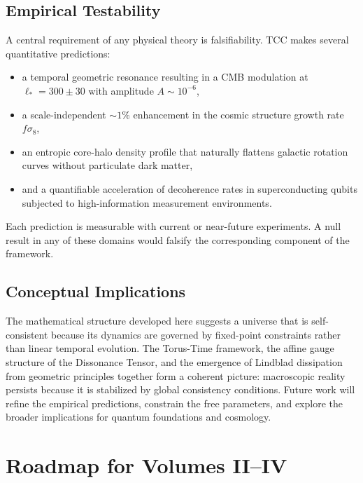 \documentclass[12pt,openany]{book}
\theoremstyle{plain}
\theoremstyle{definition}
\theoremstyle{remark}
\begin{document}
\section{Empirical Testability}

A central requirement of any physical theory is falsifiability.  
TCC makes several quantitative predictions:

\begin{itemize}
    \item a temporal geometric resonance resulting in a CMB modulation at $\ell_* = 300 \pm 30$ with amplitude $A \sim 10^{-6}$,
    \item a scale-independent $\sim 1\%$ enhancement in the cosmic structure growth rate $f\sigma_8$,
    \item an entropic core-halo density profile that naturally flattens galactic rotation curves without particulate dark matter,
    \item and a quantifiable acceleration of decoherence rates in superconducting qubits subjected to high-information measurement environments.
\end{itemize}

Each prediction is measurable with current or near-future experiments.  
A null result in any of these domains would falsify the corresponding 
component of the framework.

\section{Conceptual Implications}

The mathematical structure developed here suggests a universe that is self-consistent because its dynamics are governed by fixed-point constraints rather than linear temporal evolution. The Torus-Time framework, the affine gauge structure of the Dissonance Tensor, and the emergence of Lindblad dissipation from geometric principles together form a coherent picture: macroscopic reality persists because it is stabilized by global consistency conditions. Future work will refine the empirical predictions, constrain the free parameters, and explore the broader implications for quantum foundations and cosmology.

\chapter{Roadmap for Volumes II–IV}
\end{document}

